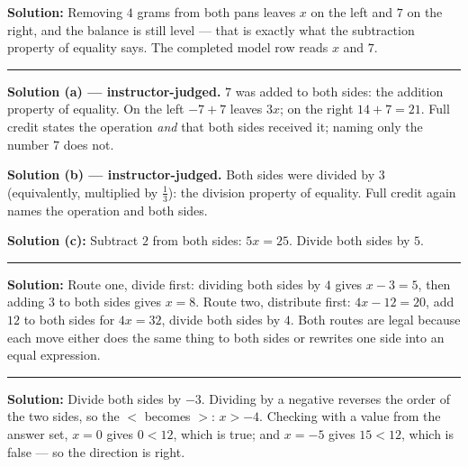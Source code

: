 \documentclass[12pt]{article}
\begin{document}



\textbf{Solution:} \quad Removing $4$ grams from both pans leaves $x$ on the left and $7$ on the
right, and the balance is still level --- that is exactly what the subtraction property of equality
says. The completed model row reads $x$ and $7$. 

\vspace{0.15cm}\noindent\rule{\linewidth}{0.2pt}


\textbf{Solution (a) --- instructor-judged.} $7$ was added to both sides: the addition property of
equality. On the left $-7 + 7$ leaves $3x$; on the right $14 + 7 = 21$. Full credit states the
operation \emph{and} that both sides received it; naming only the number $7$ does not.

\noindent\textbf{Solution (b) --- instructor-judged.} Both sides were divided by $3$ (equivalently,
multiplied by $\frac{1}{3}$): the division property of equality. Full credit again names the
operation and both sides.

\noindent\textbf{Solution (c):} \quad Subtract $2$ from both sides: $5x = 25$. Divide both sides by
$5$. 

\vspace{0.15cm}\noindent\rule{\linewidth}{0.2pt}


\textbf{Solution:} \quad Route one, divide first: dividing both sides by $4$ gives $x - 3 = 5$, then
adding $3$ to both sides gives $x = 8$. Route two, distribute first: $4x - 12 = 20$, add $12$ to
both sides for $4x = 32$, divide both sides by $4$. Both routes are legal because each move either
does the same thing to both sides or rewrites one side into an equal expression. 

\vspace{0.15cm}\noindent\rule{\linewidth}{0.2pt}


\textbf{Solution:} \quad Divide both sides by $-3$. Dividing by a negative reverses the order of the
two sides, so the $<$ becomes $>$: $x > -4$. Checking with a value from the answer set, $x = 0$
gives $0 < 12$, which is true; and $x = -5$ gives $15 < 12$, which is false --- so the direction is
right. 
\end{document}
